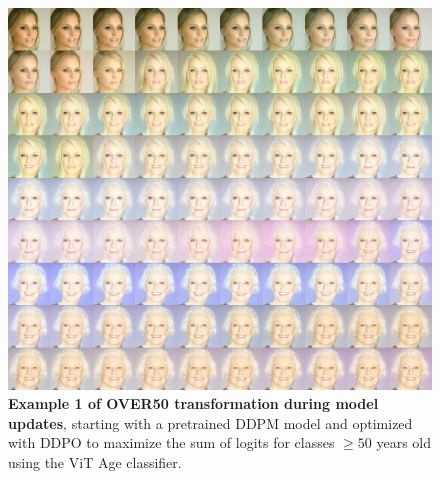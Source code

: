 \begin{appendixs}
        \begin{figure}
            \centering
            \includegraphics[scale=2.80]{img/results/over50_7.png}
            \vspace{-0pt}  %
            \captionsetup{width=\textwidth} %
            \caption{\textbf{Example 1 of OVER50 transformation during model updates}, starting with a pretrained DDPM model and optimized with DDPO to maximize the sum of logits for classes $\geq 50$ years old using the ViT Age classifier.}
            \label{fig:ddpm-to-ddpo-over50-extra1}
        \end{figure}


\end{appendixs}
